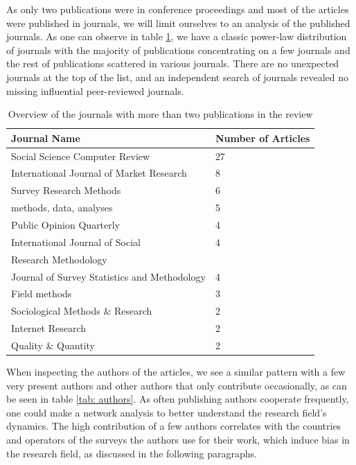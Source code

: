 As only two publications were in conference proceedings and most of the articles were published in journals, we will limit ourselves to an analysis of the published journals. As one can observe in table \ref{tab: journals}, we have a classic power-law distribution of journals with the majority of publications concentrating on a few journals and the rest of publications scattered in various journals. There are no unexpected journals at the top of the list, and an independent search of journals revealed no missing influential peer-reviewed journals. 

\begin{table}
	\centering
	\begin{tabular}{ll}
		\toprule
		Journal Name & Number of Articles \\
		\midrule
        Social Science Computer Review & 27\\
        International Journal of Market Research & 8\\
        Survey Research Methods& 6\\
        methods, data, analyses & 5\\
        Public Opinion Quarterly & 4\\
        International Journal of Social & 4 \\
        Research Methodology & \\
        Journal of Survey Statistics and Methodology & 4\\
        Field methods & 3\\
        Sociological Methods \& Research & 2\\
        Internet Research & 2 \\
        Quality \& Quantity  & 2\\
		\bottomrule 
	\end{tabular}
	\caption{Overview of the journals with more than two publications in the review}
	\label{tab: journals}
\end{table}

When inspecting the authors of the articles, we see a similar pattern with a few very present authors and other authors that only contribute occasionally, as can be seen in table \ref{tab: authors}. As often publishing authors cooperate frequently, one could make a network analysis to better understand the research field's dynamics. The high contribution of a few authors correlates with the countries and operators of the surveys the authors use for their work, which induce bias in the research field, as discussed in the following paragraphs.


